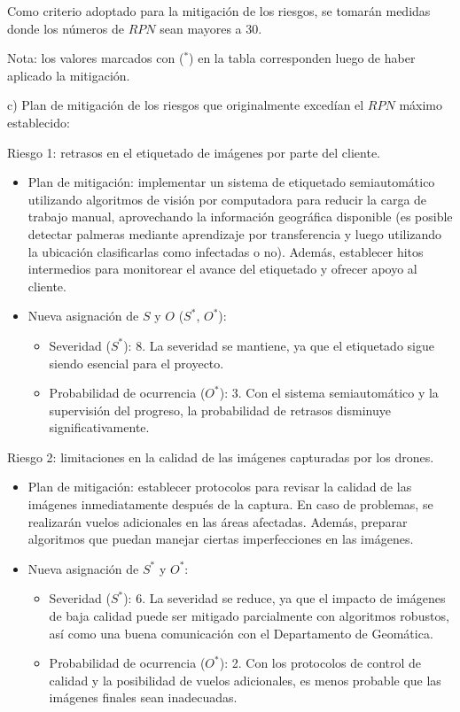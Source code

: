 \documentclass[
11pt, %
]{charter}
\begin{document}
Como criterio adoptado para la mitigación de los riesgos, se tomarán medidas donde los números de $RPN$ sean mayores a 30.

Nota: los valores marcados con ($^*$) en la tabla corresponden luego de haber aplicado la mitigación.

c) Plan de mitigación de los riesgos que originalmente excedían el $RPN$ máximo establecido:

Riesgo 1: retrasos en el etiquetado de imágenes por parte del cliente.
\begin{itemize}
  \item Plan de mitigación: implementar un sistema de etiquetado semiautomático utilizando algoritmos de visión por computadora para reducir la carga de trabajo manual, aprovechando la información geográfica disponible (es posible detectar palmeras mediante aprendizaje por transferencia y luego utilizando la ubicación clasificarlas como infectadas o no). Además, establecer hitos intermedios para monitorear el avance del etiquetado y ofrecer apoyo al cliente.
  \item Nueva asignación de $S$ y $O$ ($S^*$, $O^*$):
        \begin{itemize}
          \item Severidad ($S^*$): 8. La severidad se mantiene, ya que el etiquetado sigue siendo esencial para el proyecto.
          \item Probabilidad de ocurrencia ($O^*$): 3. Con el sistema semiautomático y la supervisión del progreso, la probabilidad de retrasos disminuye significativamente.
        \end{itemize}
\end{itemize}

Riesgo 2: limitaciones en la calidad de las imágenes capturadas por los drones.
\begin{itemize}
  \item Plan de mitigación: establecer protocolos para revisar la calidad de las imágenes inmediatamente después de la captura. En caso de problemas, se realizarán vuelos adicionales en las áreas afectadas. Además, preparar algoritmos que puedan manejar ciertas imperfecciones en las imágenes.
  \item Nueva asignación de $S^*$ y $O^*$:
        \begin{itemize}
          \item Severidad ($S^*$): 6. La severidad se reduce, ya que el impacto de imágenes de baja calidad puede ser mitigado parcialmente con algoritmos robustos, así como una buena comunicación con el Departamento de Geomática.
          \item Probabilidad de ocurrencia ($O^*$): 2. Con los protocolos de control de calidad y la posibilidad de vuelos adicionales, es menos probable que las imágenes finales sean inadecuadas.
        \end{itemize}
\end{itemize}
\end{document}
